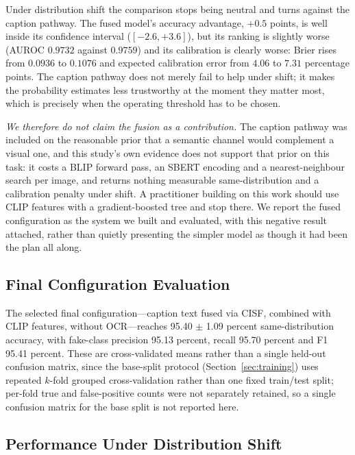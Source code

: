 \documentclass[conference,a4paper]{IEEEtran}
\begin{document}
Under distribution shift the comparison stops being neutral and turns against
the caption pathway. The fused model's accuracy advantage, $+0.5$ points, is
well inside its confidence interval ($[-2.6, +3.6]$), but its ranking is
slightly worse (AUROC $0.9732$ against $0.9759$) and its calibration is
clearly worse: Brier rises from $0.0936$ to $0.1076$ and expected calibration
error from $4.06$ to $7.31$ percentage points. The caption pathway does not
merely fail to help under shift; it makes the probability estimates less
trustworthy at the moment they matter most, which is precisely when the
operating threshold has to be chosen.

\emph{We therefore do not claim the fusion as a contribution.} The caption
pathway was included on the reasonable prior that a semantic channel would
complement a visual one, and this study's own evidence does not support that
prior on this task: it costs a BLIP forward pass, an SBERT encoding and a
nearest-neighbour search per image, and returns nothing measurable
same-distribution and a calibration penalty under shift. A practitioner
building on this work should use CLIP features with a gradient-boosted tree
and stop there. We report the fused configuration as the system we built and
evaluated, with this negative result attached, rather than quietly presenting
the simpler model as though it had been the plan all along.

\subsection{Final Configuration Evaluation}

The selected final configuration---caption text fused via CISF, combined with
CLIP features, without OCR---reaches 95.40 $\pm$ 1.09 percent
same-distribution accuracy, with fake-class precision 95.13 percent, recall
95.70 percent and F1 95.41 percent. These are cross-validated means rather
than a single held-out confusion matrix, since the base-split protocol
(Section~\ref{sec:training}) uses repeated $k$-fold grouped cross-validation
rather than one fixed train/test split; per-fold true and false-positive counts were
not separately retained, so a single confusion matrix for the base split is
not reported here.

\subsection{Performance Under Distribution Shift}
\label{sec:shift}
\end{document}
